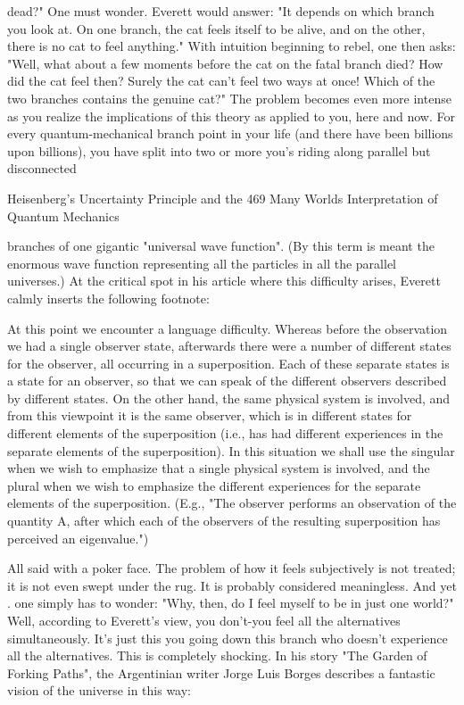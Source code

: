 dead?" One must wonder. Everett would answer: "It depends on which branch you
look at. On one branch, the cat feels itself to be alive, and on the other, there is no cat
to feel anything." With intuition beginning to rebel, one then asks: "Well, what about
a few moments before the cat on the fatal branch died? How did the cat feel then?
Surely the cat can't feel two ways at once! Which of the two branches contains the
genuine cat?"
        The problem becomes even more intense as you realize the implications of this
theory as applied to you, here and now. For every quantum-mechanical branch point
in your life (and there have been billions upon billions), you have split into two or
more you's riding along parallel but disconnected




Heisenberg's Uncertainty Principle and the                                             469
Many Worlds Interpretation of Quantum Mechanics

branches of one gigantic "universal wave function". (By this term is meant the
enormous wave function representing all the particles in all the parallel universes.) At
the critical spot in his article where this difficulty arises, Everett calmly inserts the
following footnote:

           At this point we encounter a language difficulty. Whereas before the
   observation we had a single observer state, afterwards there were a number of
   different states for the observer, all occurring in a superposition. Each of these
   separate states is a state for an observer, so that we can speak of the different
   observers described by different states. On the other hand, the same physical
   system is involved, and from this viewpoint it is the same observer, which is in
   different states for different elements of the superposition (i.e., has had different
   experiences in the separate elements of the superposition). In this situation we
   shall use the singular when we wish to emphasize that a single physical system
   is involved, and the plural when we wish to emphasize the different experiences
   for the separate elements of the superposition. (E.g., "The observer performs an
   observation of the quantity A, after which each of the observers of the resulting
   superposition has perceived an eigenvalue.")

        All said with a poker face. The problem of how it feels subjectively is not
treated; it is not even swept under the rug. It is probably considered meaningless.
        And yet . one simply has to wonder: "Why, then, do I feel myself to be in just
one world?" Well, according to Everett's view, you don't-you feel all the alternatives
simultaneously. It's just this you going down this branch who doesn't experience all
the alternatives. This is completely shocking. In his story "The Garden of Forking
Paths", the Argentinian writer Jorge Luis Borges describes a fantastic vision of the
universe in this way:

